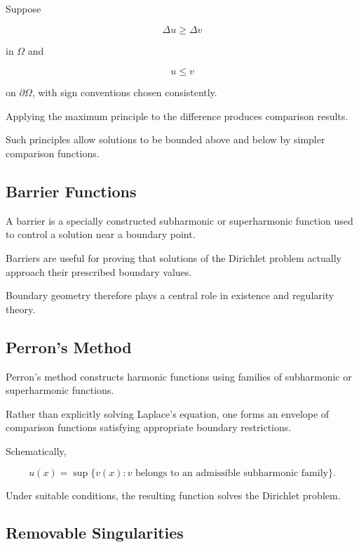 Suppose

\[
\Delta u\geq\Delta v
\]

in \(\Omega\) and

\[
u\leq v
\]

on \(\partial\Omega\), with sign conventions chosen consistently.

Applying the maximum principle to the difference produces comparison
results.

Such principles allow solutions to be bounded above and below by simpler
comparison functions.

\subsection{Barrier Functions}
\label{subsec:barrier-functions}

A barrier is a specially constructed subharmonic or superharmonic
function used to control a solution near a boundary point.

Barriers are useful for proving that solutions of the Dirichlet problem
actually approach their prescribed boundary values.

Boundary geometry therefore plays a central role in existence and
regularity theory.

\subsection{Perron's Method}
\label{subsec:perrons-method}

Perron's method constructs harmonic functions using families of
subharmonic or superharmonic functions.

Rather than explicitly solving Laplace's equation, one forms an envelope
of comparison functions satisfying appropriate boundary restrictions.

Schematically,

\[
\boxed{
u(x)
=
\sup\{
v(x):v\text{ belongs to an admissible subharmonic family}
\}.
}
\]

Under suitable conditions, the resulting function solves the Dirichlet
problem.

\subsection{Removable Singularities}
\label{subsec:harmonic-removable-singularities}


